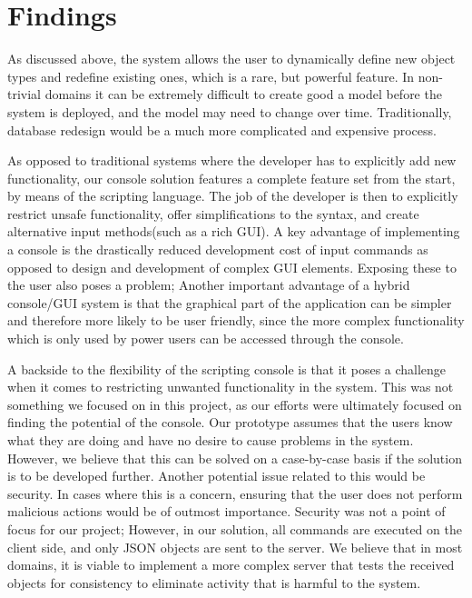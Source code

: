 \section{Findings}
As discussed above, the system allows the user to dynamically define new object types and redefine existing ones, which is a rare, but powerful feature. In non-trivial domains it can be extremely difficult to create good a model before the system is deployed, and the model may need to change over time. Traditionally, database redesign would be a much more complicated and expensive process.
\cite{kroenke2006database}

As opposed to traditional systems where the developer has to explicitly add new functionality, our console solution features a complete feature set from the start, by means of the scripting language. The job of the developer is then to explicitly restrict unsafe functionality, offer simplifications to the syntax, and create alternative input methods(such as a rich GUI). A key advantage of implementing a console is the drastically reduced development cost of input commands as opposed to design and development of complex GUI elements. Exposing these to the user also poses a problem; Another important advantage of a hybrid console/GUI system is that the graphical part of the application can be simpler and therefore more likely to be user friendly, since the more complex functionality which is only used by power users can be accessed through the console. 

A backside to the flexibility of the scripting console is that it poses a challenge when it comes to restricting unwanted functionality in the system. This was not something we focused on in this project, as our efforts were ultimately focused on finding the potential of the console. Our prototype assumes that the users know what they are doing and have no desire to cause problems in the system. However, we believe that this can be solved on a case-by-case basis if the solution is to be developed further. Another potential issue related to this would be security. In cases where this is a concern, ensuring that the user does not perform malicious actions would be of outmost importance. Security was not a point of focus for our project; However, in our solution, all commands are executed on the client side, and only JSON objects are sent to the server. We believe that in most domains, it is viable to implement a more complex server that tests the received objects for consistency to eliminate activity that is harmful to the system.

